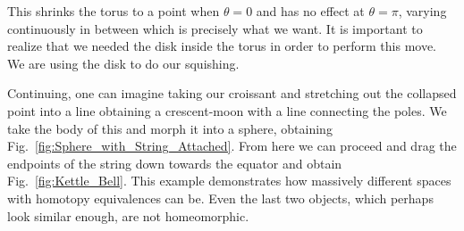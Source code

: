 \documentclass{book}                                                           %
\begin{document}
                This shrinks the torus to a point when $\theta=0$ and has no
                effect at $\theta=\pi$, varying continuously in between which is
                precisely what we want. It is important to realize that we
                needed the disk inside the torus in order to perform this move.
                We are using the disk to do our squishing.
                \par\hfill\par
                \begin{minipage}{0.50\textwidth}
                    Continuing, one can imagine taking our croissant and
                    stretching out the collapsed point into a line obtaining a
                    crescent-moon with a line connecting the poles. We take the
                    body of this and morph it into a sphere, obtaining
                    Fig.~\ref{fig:Sphere_with_String_Attached}. From here we can
                    proceed and drag the endpoints of the string down towards
                    the equator and obtain Fig.~\ref{fig:Kettle_Bell}. This
                    example demonstrates how massively different spaces with
                    homotopy equivalences can be. Even the last two objects,
                    which perhaps look similar enough, are not homeomorphic.
                \end{minipage}
                \hfill
                \par\vspace{2.5ex}
\end{document}
